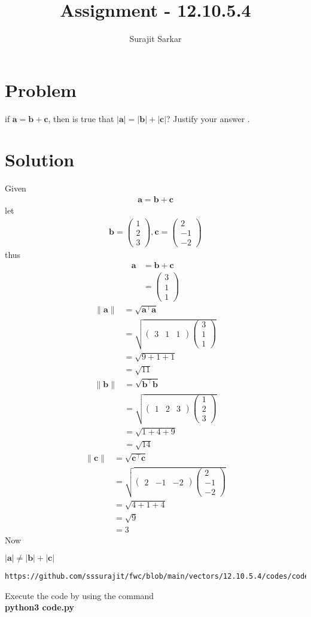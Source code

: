 \documentclass[journal,12pt,twocolumn]{IEEEtran}
\title{\mytitle}
\title{
Assignment - 12.10.5.4
}
\author{Surajit Sarkar}
\newcommand{\myvec}[1]{\ensuremath{\begin{pmatrix}#1\end{pmatrix}}}
\providecommand{\norm}[1]{\lVert#1\rVert}
\let\vec\mathbf
\begin{document}
\maketitle
\tableofcontents
\bigskip
\section{\textbf{Problem}}
if $\vec{a}=\vec{b}+\vec{c}$, then is true that $|\vec{a}|=|\vec{b}|+|\vec{c}|$?
Justify your answer .
\section{\textbf{Solution}}
Given
\begin{align}
    \vec{a}=\vec{b}+\vec{c}
\end{align}
let
\begin{align}
    \vec{b}=\myvec{1\\2\\3},\vec{c}=\myvec{2\\-1\\-2}
\end{align}
thus
\begin{align}
    \vec{a}&=\vec{b}+\vec{c}\\
    &=\myvec{3\\1\\1}
\end{align}
\begin{align}
    \norm{\vec{a}}&=\sqrt{\vec{a}^{\top}\vec{a}}\\
    &=\sqrt{\myvec{3&1&1}\myvec{3\\1\\1}}\\
    &=\sqrt{9+1+1}\\
    &=\sqrt{11}
\end{align}
\begin{align}
    \norm{\vec{b}}&=\sqrt{\vec{b}^{\top}\vec{b}}\\
    &=\sqrt{\myvec{1&2&3}\myvec{1\\2\\3}}\\
    &=\sqrt{1+4+9}\\
    &=\sqrt{14}
\end{align}
\begin{align}
    \norm{\vec{c}}&=\sqrt{\vec{c}^{\top}\vec{c}}\\
    &=\sqrt{\myvec{2&-1&-2}\myvec{2\\-1\\-2}}\\
    &=\sqrt{4+1+4}\\
    &=\sqrt{9}\\
    &=3
\end{align}
Now
\begin{center}
    $|\vec{a}|\neq|\vec{b}|+|\vec{c}|$
\end{center}
\begin{lstlisting}
https://github.com/sssurajit/fwc/blob/main/vectors/12.10.5.4/codes/code.py
\end{lstlisting}
Execute the code by using the command\\
\textbf{python3 code.py}
\end{document}
